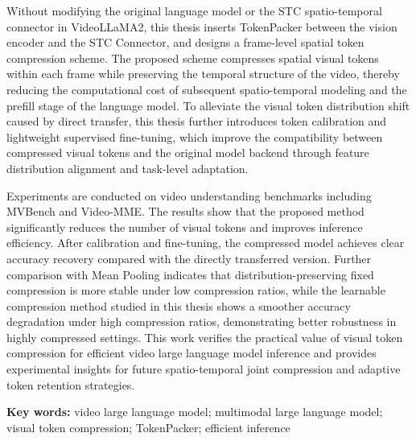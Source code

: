 Without modifying the original language model or the STC spatio-temporal connector in VideoLLaMA2, this thesis inserts TokenPacker between the vision encoder and the STC Connector, and designs a frame-level spatial token compression scheme. The proposed scheme compresses spatial visual tokens within each frame while preserving the temporal structure of the video, thereby reducing the computational cost of subsequent spatio-temporal modeling and the prefill stage of the language model. To alleviate the visual token distribution shift caused by direct transfer, this thesis further introduces token calibration and lightweight supervised fine-tuning, which improve the compatibility between compressed visual tokens and the original model backend through feature distribution alignment and task-level adaptation.

Experiments are conducted on video understanding benchmarks including MVBench and Video-MME. The results show that the proposed method significantly reduces the number of visual tokens and improves inference efficiency. After calibration and fine-tuning, the compressed model achieves clear accuracy recovery compared with the directly transferred version. Further comparison with Mean Pooling indicates that distribution-preserving fixed compression is more stable under low compression ratios, while the learnable compression method studied in this thesis shows a smoother accuracy degradation under high compression ratios, demonstrating better robustness in highly compressed settings. This work verifies the practical value of visual token compression for efficient video large language model inference and provides experimental insights for future spatio-temporal joint compression and adaptive token retention strategies.

\textbf{Key words:} video large language model; multimodal large language model; visual token compression; TokenPacker; efficient inference

